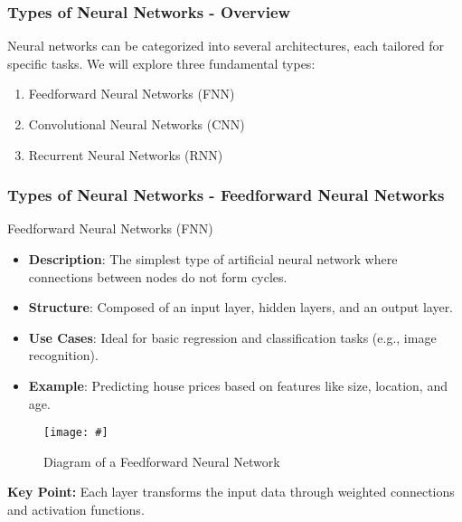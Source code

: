 \documentclass[aspectratio=169]{beamer}
\begin{document}
\begin{frame}[fragile]
    \frametitle{Types of Neural Networks - Overview}
    Neural networks can be categorized into several architectures, each tailored for specific tasks. We will explore three fundamental types:
    \begin{enumerate}
        \item Feedforward Neural Networks (FNN)
        \item Convolutional Neural Networks (CNN)
        \item Recurrent Neural Networks (RNN)
    \end{enumerate}
\end{frame}

\begin{frame}[fragile]
    \frametitle{Types of Neural Networks - Feedforward Neural Networks}
    \begin{block}{Feedforward Neural Networks (FNN)}
        \begin{itemize}
            \item \textbf{Description}: The simplest type of artificial neural network where connections between nodes do not form cycles.
            \item \textbf{Structure}: Composed of an input layer, hidden layers, and an output layer.
            \item \textbf{Use Cases}: Ideal for basic regression and classification tasks (e.g., image recognition).
            \item \textbf{Example}: Predicting house prices based on features like size, location, and age.
        \end{itemize}
    \end{block}
    
    \begin{figure}
        \centering
        \texttt{[image: \#]} %
        \caption{Diagram of a Feedforward Neural Network}
    \end{figure}
    
    \textbf{Key Point:} Each layer transforms the input data through weighted connections and activation functions.
\end{frame}
\end{document}
